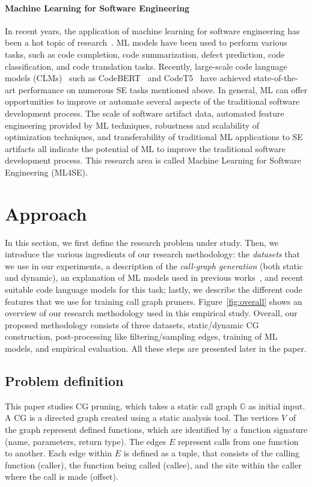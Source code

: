 \paragraph{Machine Learning for Software Engineering}
In recent years, the application of machine learning for software engineering has been a hot topic of research~\cite{allamanis2018survey, sharma2021survey}. ML models have been used to perform various tasks, such as code completion, code summarization, defect prediction, code classification, and code translation tasks. Recently, large-scale code language models (CLMs)~\cite{zan2022neural} such as CodeBERT~\cite{feng2020codebert} and CodeT5~\cite{wang2021codet5} have achieved state-of-the-art performance on numerous SE tasks mentioned above. In general, ML can offer opportunities to improve or automate several aspects of the traditional software development process. The scale of software artifact data, automated feature engineering provided by ML techniques, robustness and scalability of optimization techniques, and transferability of traditional ML applications to SE artifacts all indicate the potential of ML to improve the traditional software development process. This research area is called Machine Learning for Software Engineering (ML4SE).

\section{Approach}\label{ch1:sec:approach}
In this section, we first define the research problem under study. Then, we introduce the various ingredients of our research methodology: the \emph{datasets} that we use in our experiments, a description of the \emph{call-graph generation} (both static and dynamic), an explanation of ML models used in previous works~\cite{utture2022striking, le2022autopruner}, and recent suitable code language models for this task; lastly, we describe the different code features that we use for training call graph pruners. Figure~\ref{fig:overall} shows an overview of our research methodology used in this empirical study. Overall, our proposed methodology consists of three datasets, static/dynamic CG construction, post-processing like filtering/sampling edges, training of ML models, and empirical evaluation. All these steps are presented later in the paper.

\subsection{Problem definition}
This paper studies CG pruning, which takes a static call graph $\mathbb{G}$ as initial input. A CG is a directed graph created using a static analysis tool.
The vertices $V$ of the graph represent defined functions, which are identified by a function signature (name, parameters, return type).
The edges $E$ represent calls from one function to another.
Each edge within $E$ is defined as a tuple, that consists of the calling function (caller), the function being called (callee), and the site within the caller where the call is made (offset).

